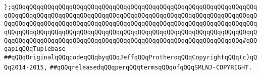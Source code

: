 \newline
\verb|};qQQqqQQqqQQqqQQqqQQqqQQqqQQqqQQqqQQqqQQqqQQqqQQqqQQqqQQqqQQqqQQqqQQqqQQqqQQqqQQqqQQqqQQqqQQqqQQqqQQqqQQqqQQqqQQqqQQqqQQqqQQqqQQqqQQqqQQqqQQqqQQqqQQqqQQqqQQqqQQqqQQqqQQqqQQqqQQqqQQqqQQqqQQqqQQqqQQqqQQqqQQqqQQqqQQqqQQqqQQqqQQqqQQqqQQqqQQqqQQqqQQqqQQqqQQqqQQqqQQqqQQqqQQqqQQqqQQqqQQqqQQqqQQqqQQqqQQqqQQqqQQqqQQqqQQqqQQqqQQqqQQqqQQqqQQqqQQqqQQqqQQq#qQQqapiqQQqTuplebase|\newline
\newline
\newline
\verb|##qQQqOriginalqQQqcodeqQQqbyqQQqJeffqQQqProtheroqQQqCopyrightqQQq(c)qQQq2014-2015,|\newline
\verb|##qQQqreleasedqQQqperqQQqtermsqQQqofqQQqSMLNJ-COPYRIGHT.|\newline

